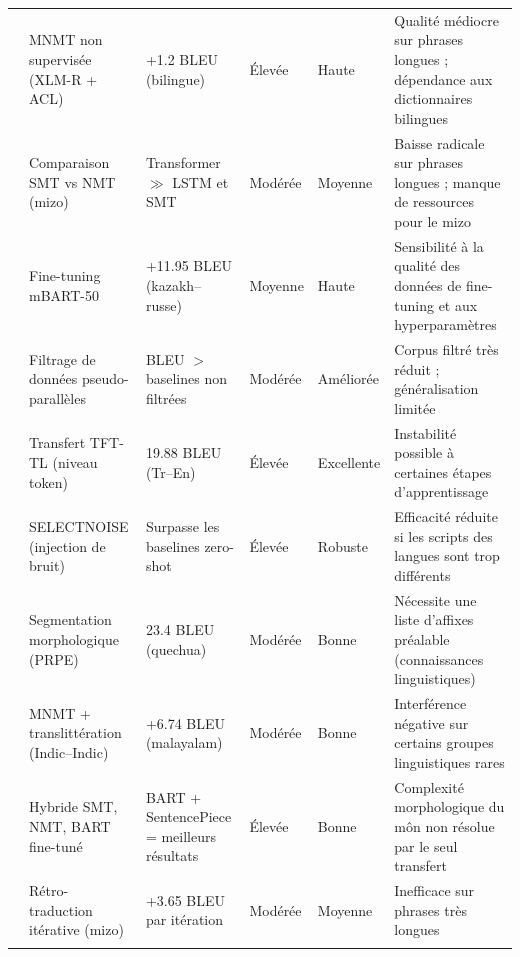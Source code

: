 \begin{longtable}{p{2.8cm}p{2.8cm}p{2.2cm}p{1.9cm}p{1.9cm}p{3.2cm}}
\bottomrule
\endlastfoot
\citeauthor{ali2026hybrid} \cite{ali2026hybrid} &
\ac{MNMT} non supervisée (XLM-R + ACL) &
+1.2 \ac{BLEU} (bilingue) &
Élevée &
Haute &
Qualité médiocre sur phrases longues ; dépendance aux dictionnaires bilingues \\
\citeauthor{lalrempuii2021improved} \cite{lalrempuii2021improved} &
Comparaison SMT vs NMT (mizo) &
Transformer $\gg$ LSTM et SMT &
Modérée &
Moyenne &
Baisse radicale sur phrases longues ; manque de ressources pour le mizo \\
\citeauthor{kozhirbayev2024enhancing} \cite{kozhirbayev2024enhancing} &
Fine-tuning mBART-50 &
+11.95 \ac{BLEU} (kazakh--russe) &
Moyenne &
Haute &
Sensibilité à la qualité des données de fine-tuning et aux hyperparamètres \\
\citeauthor{ahmadnia2021impact} \cite{ahmadnia2021impact} &
Filtrage de données pseudo-parallèles &
BLEU $>$ baselines non filtrées &
Modérée &
Améliorée &
Corpus filtré très réduit ; généralisation limitée \\
\citeauthor{dai2025tfttl} \cite{dai2025tfttl} &
Transfert TFT-TL (niveau token) &
19.88 \ac{BLEU} (Tr--En) &
Élevée &
Excellente &
Instabilité possible à certaines étapes d'apprentissage \\
\citeauthor{brahma2023selectnoise} \cite{brahma2023selectnoise} &
SELECTNOISE (injection de bruit) &
Surpasse les baselines zero-shot &
Élevée &
Robuste &
Efficacité réduite si les scripts des langues sont trop différents \\
\citeauthor{chen-fazio-2021-morphologically} \cite{chen-fazio-2021-morphologically} &
Segmentation morphologique (PRPE) &
23.4 \ac{BLEU} (quechua) &
Modérée &
Bonne &
Nécessite une liste d'affixes préalable (connaissances linguistiques) \\
\citeauthor{bala2024multilingual} \cite{bala2024multilingual} &
MNMT + translittération (Indic--Indic) &
+6.74 \ac{BLEU} (malayalam) &
Modérée &
Bonne &
Interférence négative sur certains groupes linguistiques rares \\
\citeauthor{tun2025exploring} \cite{tun2025exploring} &
Hybride SMT, NMT, BART fine-tuné &
BART + \ac{SentencePiece} = meilleurs résultats &
Élevée &
Bonne &
Complexité morphologique du môn non résolue par le seul transfert \\
\citeauthor{ahmed2023guit} \cite{ahmed2023guit} &
Rétro-traduction itérative (mizo) &
+3.65 \ac{BLEU} par itération &
Modérée &
Moyenne &
Inefficace sur phrases très longues \\
\citeauthor{gronroos2020transfer} \cite{gronroos2020transfer} &

\end{longtable}
